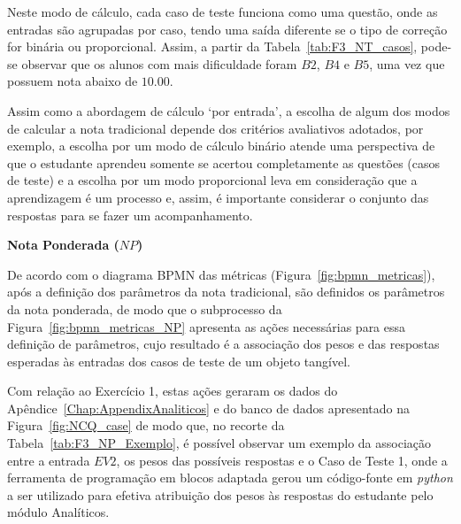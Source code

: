 Neste modo de cálculo, cada caso de teste funciona como uma questão, onde as entradas são agrupadas por caso, tendo uma saída diferente se o tipo de correção for binária ou proporcional. Assim, a partir da Tabela~\ref{tab:F3_NT_casos}, pode-se observar que os alunos com mais dificuldade foram $B2$, $B4$ e $B5$, uma vez que possuem nota abaixo de $10.00$. 

Assim como a abordagem de cálculo `por entrada', a escolha de algum dos modos de calcular a nota tradicional depende dos critérios avaliativos adotados, por exemplo, a escolha por um modo de cálculo binário atende uma perspectiva de que o estudante aprendeu somente se acertou completamente as questões (casos de teste) e a escolha por um modo proporcional leva em consideração que a aprendizagem é um processo e, assim, é importante considerar o conjunto das respostas para se fazer um acompanhamento.

\textbf{Nota Ponderada ($NP$)}

De acordo com o diagrama BPMN das métricas (Figura~\ref{fig:bpmn_metricas}), após a definição dos parâmetros da nota tradicional, são definidos os parâmetros da nota ponderada, de modo que o subprocesso da Figura~\ref{fig:bpmn_metricas_NP} apresenta as ações necessárias para essa definição de parâmetros, cujo resultado é a associação dos pesos e das respostas esperadas às entradas dos casos de teste de um objeto tangível. 

Com relação ao Exercício 1, estas ações geraram os dados do Apêndice~\ref{Chap:AppendixAnaliticos} e do banco de dados apresentado na Figura~\ref{fig:NCQ_case} de modo que, no recorte da Tabela~\ref{tab:F3_NP_Exemplo}, é possível observar um exemplo da associação entre a entrada $EV2$, os pesos das possíveis respostas e o Caso de Teste 1, onde a ferramenta de programação em blocos adaptada gerou um código-fonte em \textit{python} a ser utilizado para efetiva atribuição dos pesos às respostas do estudante pelo módulo Analíticos.

